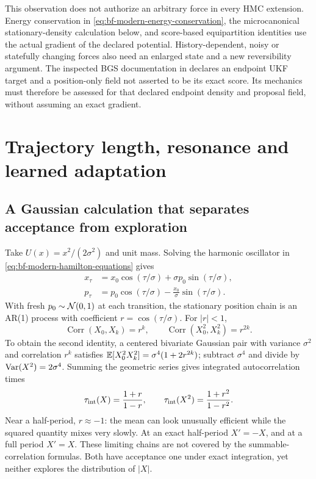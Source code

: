 This observation does not authorize an arbitrary force in every HMC
extension. Energy conservation in \eqref{eq:bf-modern-energy-conservation},
the microcanonical stationary-density calculation below, and score-based
equipartition identities use the actual gradient of the declared potential.
History-dependent, noisy or statefully changing forces also need an enlarged
state and a new reversibility argument. The inspected BGS documentation in
 declares an endpoint UKF target and a position-only field not
asserted to be its exact score. Its mechanics must therefore be assessed for
that declared endpoint density and proposal field, without assuming an exact
gradient.

\section{Trajectory length, resonance and learned adaptation}
\label{sec:bf-modern-trajectories}

\subsection{A Gaussian calculation that separates acceptance from exploration}

Take $U(x)=x^2/(2\sigma^2)$ and unit mass. Solving the harmonic oscillator
in \eqref{eq:bf-modern-hamilton-equations} gives
\begin{align}
 x_\tau&=x_0\cos(\tau/\sigma)+\sigma p_0\sin(\tau/\sigma),\\
 p_\tau&=p_0\cos(\tau/\sigma)-\frac{x_0}{\sigma}\sin(\tau/\sigma).
 \label{eq:bf-modern-gaussian-flow}
\end{align}
With fresh $p_0\sim\mathcal{N}(0,1)$ at each transition, the stationary position
chain is an AR(1) process with coefficient $r=\cos(\tau/\sigma)$. For
$|r|<1$,
\begin{equation}
 \operatorname{Corr}(X_0,X_k)=r^k,\qquad
 \operatorname{Corr}(X_0^2,X_k^2)=r^{2k}.
 \label{eq:bf-modern-gaussian-correlations}
\end{equation}
To obtain the second identity, a centered bivariate Gaussian pair with
variance $\sigma^2$ and correlation $r^k$ satisfies
$\mathbb{E}[X_0^2X_k^2]=\sigma^4(1+2r^{2k})$; subtract
$\sigma^4$ and divide by $\operatorname{Var}(X^2)=2\sigma^4$. Summing the geometric
series gives integrated autocorrelation times
\begin{equation}
 \tau_{\rm int}(X)=\frac{1+r}{1-r},\qquad
 \tau_{\rm int}(X^2)=\frac{1+r^2}{1-r^2}.
 \label{eq:bf-modern-gaussian-iat}
\end{equation}
Near a half-period, $r\approx-1$: the mean can look unusually efficient
while the squared quantity mixes very slowly. At an exact half-period
$X'=-X$, and at a full period $X'=X$. These limiting chains are not covered
by the summable-correlation formulas. Both have acceptance one under exact
integration, yet neither explores the distribution of $|X|$.

